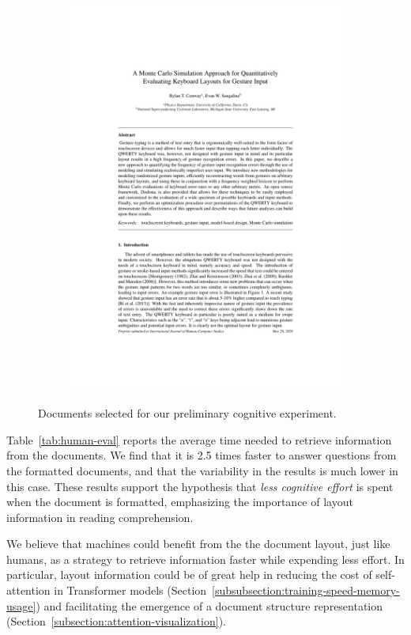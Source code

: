 \begin{figure}[!htbp]
\begin{subfigure}[b]{0.24\textwidth}
        \includegraphics[width=\textwidth]{images/chapter3/formatted_sample4.pdf}
      \end{subfigure}
      \caption{Documents selected for our preliminary cognitive experiment.}
      \label{fig:samples-chapter3}
\end{figure}

Table~\ref{tab:human-eval} reports the average time needed to retrieve information from the documents. We find that it is 2.5 times faster to answer questions from the formatted documents, and that the variability in the results is much lower in this case. These results support the hypothesis that \emph{less cognitive effort} is spent when the document is formatted, emphasizing the importance of layout information in reading comprehension.

We believe that machines could benefit from the the document layout, just like humans, as a strategy to retrieve information faster while expending less effort. In particular, layout information could be of great help in reducing the cost of self-attention in Transformer models (Section~\ref{subsubsection:training-speed-memory-usage}) and facilitating the emergence of a document structure representation (Section~\ref{subsection:attention-visualization}).

